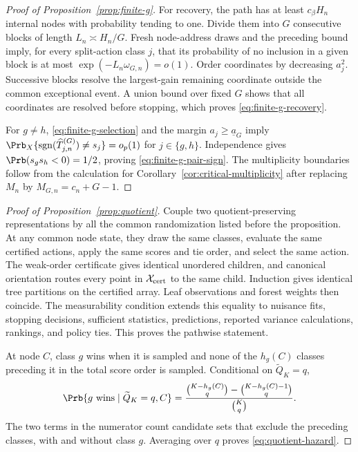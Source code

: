 \begin{appendix}
\begin{proof}[Proof of Proposition~\ref{prop:finite-g}]
For recovery, the path has at least \(c_\beta H_n\) internal nodes with
probability tending to one. Divide them into \(G\) consecutive blocks of length
\(L_n\asymp H_n/G\). Fresh node-address draws and the preceding bound imply,
for every split-action class \(j\), that its probability of no inclusion in a
given block is at most \(\exp(-L_n\omega_{G,n})=o(1)\).
Order coordinates by decreasing \(a_j^2\). Successive blocks resolve the
largest-gain remaining coordinate outside the common exceptional event. A union
bound over fixed \(G\) shows that all coordinates are resolved before stopping,
which proves \eqref{eq:finite-g-recovery}.

For \(g\ne h\), \eqref{eq:finite-g-selection} and the margin
\(a_j\ge\underline a_G\) imply
\(\Prb_X\{\operatorname{sgn}(\widehat T_{j,n}^{(G)})\ne s_j\}=o_p(1)\) for
\(j\in\{g,h\}\).
Independence gives \(\Prb(s_gs_h<0)=1/2\), proving
\eqref{eq:finite-g-pair-sign}. The multiplicity boundaries follow from the
calculation for Corollary~\ref{cor:critical-multiplicity} after replacing
\(M_n\) by \(M_{G,n}=c_n+G-1\).
\end{proof}

\begin{proof}[Proof of Proposition~\ref{prop:quotient}]
Couple two quotient-preserving representations by all the common randomization
listed before the proposition. At any common node state, they draw the same
classes, evaluate the same certified actions, apply the same scores and tie
order, and select the same action. The weak-order certificate gives identical
unordered children, and canonical orientation routes every point in
\(\mathcal X_{\rm cert}\) to the same child. Induction gives identical tree
partitions on the certified array. Leaf observations and forest weights then
coincide. The measurability condition extends this equality to nuisance fits,
stopping decisions, sufficient statistics, predictions, reported variance
calculations, rankings, and policy ties. This proves the pathwise statement.

At node \(C\), class \(g\) wins when it is sampled and none of the
\(h_g(C)\) classes preceding it in the total score order is sampled. Conditional
on \(\widetilde Q_K=q\),
\[
\Prb\{g\text{ wins}\mid \widetilde Q_K=q,C\}
=\frac{\binom{K-h_g(C)}q-\binom{K-h_g(C)-1}q}{\binom Kq}.
\]
The two terms in the numerator count candidate sets that exclude the preceding
classes, with and without class \(g\). Averaging over \(q\) proves
\eqref{eq:quotient-hazard}.
\end{proof}

\end{appendix}
